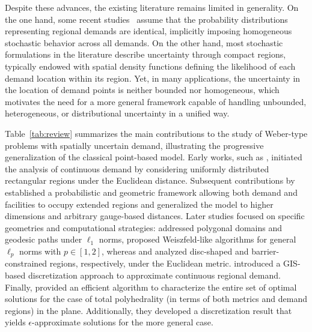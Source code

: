 \documentclass[letter,11pt, reqno]{amsart}
\renewcommand{\;}{\quad}
\theoremstyle{thmstyleone}%
\theoremstyle{thmstyletwo}%
\theoremstyle{thmstylethree}%
\begin{document}
Despite these advances, the existing literature remains limited in generality. On the one hand, some recent studies~\citep[e.g.,][]{kalczynski2025weber} assume that the probability distributions representing regional demands are identical, implicitly imposing homogeneous stochastic behavior across all demands. On the other hand, most stochastic formulations in the literature describe uncertainty through compact regions, typically endowed with spatial density functions defining the likelihood of each demand location within its region. Yet, in many applications, the uncertainty in the location of demand points is neither bounded nor homogeneous, which motivates the need for a more general framework capable of handling unbounded, heterogeneous, or distributional uncertainty in a unified way.

Table~\ref{tab:review} summarizes the main contributions to the study of Weber-type problems with spatially uncertain demand, illustrating the progressive generalization of the classical point-based model. Early works, such as \citet{love1972x}, initiated the analysis of continuous demand by considering uniformly distributed rectangular regions under the Euclidean distance. Subsequent contributions by \citet{carrizosa1995generalized, carrizosa1998weber, carrizosa1998location} established a probabilistic and geometric framework allowing both demand and facilities to occupy extended regions and generalized the model to higher dimensions and arbitrary gauge-based distances. Later studies focused on specific geometries and computational strategies: \citet{Fekete2005} addressed polygonal domains and geodesic paths under $\ell_1$ norms, \citet{valero2008single} proposed Weiszfeld-like algorithms for general $\ell_p$ norms with $p \in [1,2]$, whereas \citet{kalczynski2025weber} and \citet{ByrneKalcsics2022} analyzed disc-shaped and barrier-constrained regions, respectively, under the Euclidean metric. \citet{Yao2014} introduced a GIS-based discretization approach to approximate continuous regional demand. Finally, \citet{puerto2011structure} provided an efficient algorithm to characterize the entire set of optimal solutions for the case of total polyhedrality (in terms of both metrics and demand regions) in the plane. Additionally, they developed a discretization result that yields $\epsilon$-approximate solutions for the more general case.
\end{document}
